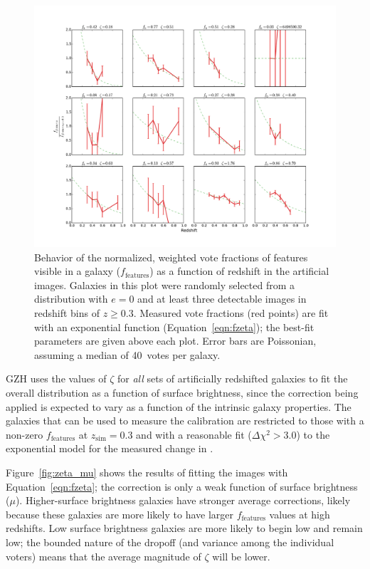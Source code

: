 \documentclass[twocolumn]{aastex6}
\begin{document}
\begin{figure}
\center
\includegraphics[width=\textwidth]{figures/zeta_examples.pdf}
\caption{Behavior of the normalized, weighted vote fractions of features
visible in a galaxy ($f_\textrm{features}$) as a function of redshift in the
artificial \ferengi{} images. Galaxies in this plot were randomly selected from
a distribution with $e=0$ and at least three detectable images in redshift bins
of $z\ge0.3$. Measured vote fractions (red points) are fit with an exponential
function (Equation~\ref{eqn:fzeta}); the best-fit parameters are given above
each plot. Error bars are Poissonian, assuming a median of 40~votes per
galaxy.}
\label{fig:zeta_examples}
\end{figure}

GZH uses the values of $\zeta$ for \emph{all} sets of artificially redshifted
galaxies to fit the overall distribution as a function of surface brightness,
since the correction being applied is expected to vary as a function of the
intrinsic galaxy properties. The galaxies that can be used to measure the
calibration are restricted to those with a non-zero $f_\textrm{features}$ at
$z_\mathrm{sim}=0.3$ and with a reasonable fit ($\Delta \chi^2 > 3.0$) to the
exponential model for the measured change in \ffeatures. 

Figure~\ref{fig:zeta_mu} shows the results of fitting the \ferengi{} images
with Equation~\ref{eqn:fzeta}; the correction is only a weak function of
surface brightness ($\mu$). Higher-surface brightness galaxies have stronger
average corrections, likely because these galaxies are more likely to have
larger $f_\textrm{features}$ values at high redshifts. Low surface brightness
galaxies are more likely to begin low and remain low; the bounded nature of the
dropoff (and variance among the individual voters) means that the average
magnitude of $\zeta$ will be lower. 
\end{document}
